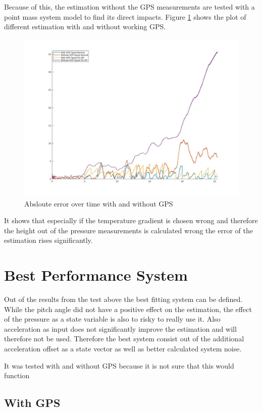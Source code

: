 Because of this, the estimation without the GPS measurements are tested with a point mass system model to find its direct impacts.
Figure \ref{fig:PointMassWithWithoutGPS} shows the plot of different estimation with and without working GPS.

\begin{figure}[h!]
 \centering
 \includegraphics[width=.8\textwidth]{./Pictures/PointMassWithWithoutGPS.jpg}
 \caption{Absloute error over time with and without GPS}
 \label{fig:PointMassWithWithoutGPS}
\end{figure}

It shows that especially if the temperature gradient is chosen wrong and
therefore the height out of the pressure measurements is calculated wrong the error of the estimation rises significantly.

\section{Best Performance System}
Out of the results from the test above the best fitting system can be defined.
While the pitch angle did not have a positive effect on the estimation, the effect of the pressure as a state variable is also to risky to really use it.
Also acceleration as input does not significantly improve the estimation and will therefore not be used.
Therefore the best system consist out of the additional acceleration offset as a state vector as well as better calculated system noise.

It was tested with and without GPS because it is not sure that this would function

\subsection{With GPS}

